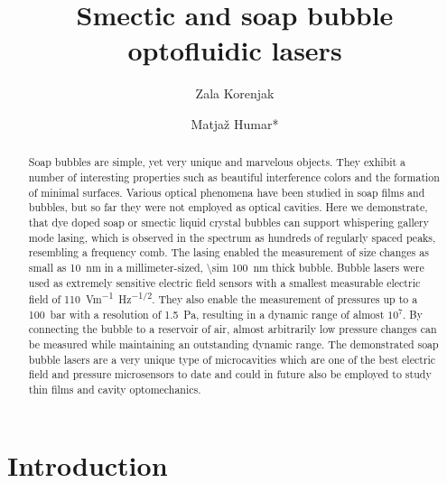 \documentclass[a4paper,12pt]{article}
\begin{document}
	
	\title{Smectic and soap bubble optofluidic lasers}
	\date{}
	\author[1,2]{Zala Korenjak}
	\author[1,2,3]{Matja\v z Humar*}
	\maketitle
	

	\begin{abstract}
		
		Soap bubbles are simple, yet very unique and marvelous objects. They exhibit a number of interesting properties such as beautiful interference colors and the formation of minimal surfaces. Various optical phenomena have been studied in soap films and bubbles, but so far they were not employed as optical cavities. Here we demonstrate, that dye doped soap or smectic liquid crystal bubbles can support whispering gallery mode lasing, which is observed in the spectrum as hundreds of regularly spaced peaks, resembling a frequency comb. The lasing enabled the measurement of size changes as small as \SI{10}{nm} in a millimeter-sized, \SI{\sim 100}{nm} thick bubble. Bubble lasers were used as extremely sensitive electric field sensors with a smallest measurable electric field of \SI{110}{Vm^{-1}Hz^{-1/2}}. They also enable the measurement of pressures up to a \SI{100}{bar} with a resolution of \SI{1.5}{Pa}, resulting in a dynamic range of almost $10^7$. By connecting the bubble to a reservoir of air, almost arbitrarily low pressure changes can be measured while maintaining an outstanding dynamic range. The demonstrated soap bubble lasers are a very unique type of microcavities which are one of the best electric field and pressure microsensors to date and could in future also be employed to study thin films and cavity optomechanics.
		
	\end{abstract}
	
	\section*{Introduction}
	
\end{document}
